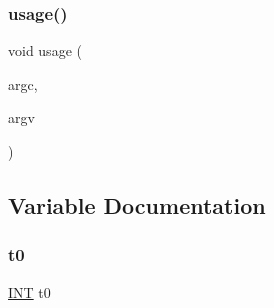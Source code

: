 \mbox{\label{graph_8_c_a4f6af65d82bb5ceda6c2bdbee492b8f8}} 
\subsubsection{\texorpdfstring{usage()}{usage()}}
{\footnotesize\ttfamily void usage (\begin{DoxyParamCaption}\item[{int}]{argc,  }\item[{const char $\ast$$\ast$}]{argv }\end{DoxyParamCaption})}



\subsection{Variable Documentation}
\mbox{\label{graph_8_c_a4268f4fe222ffb119218a0199f5e1904}} 
\subsubsection{\texorpdfstring{t0}{t0}}
{\footnotesize\ttfamily \mbox{\hyperlink{galois_8h_a09fddde158a3a20bd2dcadb609de11dc}{I\+NT}} t0}

